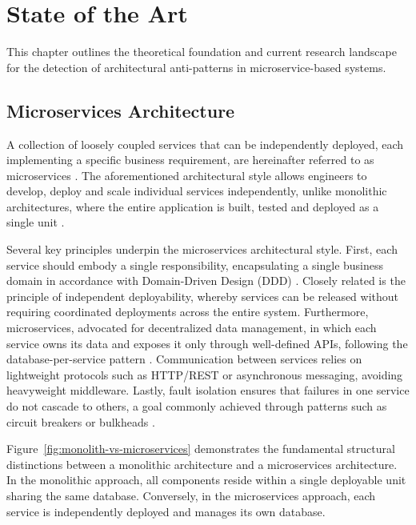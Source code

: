 \chapter{State of the Art}
\label{chap:ch2}

\par This chapter outlines the theoretical foundation and current research landscape for the detection of architectural anti-patterns in microservice-based systems.

\section {Microservices Architecture}
\label{section:microservices-background}

\par A collection of loosely coupled services that can be independently deployed, each implementing a specific business requirement, are hereinafter referred to as microservices \cite{Newman2015}. The aforementioned architectural style allows engineers to develop, deploy and scale individual services independently, unlike monolithic architectures, where the entire application is built, tested and deployed as a single unit \cite{Richardson2018}.

Several key principles underpin the microservices architectural style. First, each service should embody a single responsibility, encapsulating a single business domain in accordance with Domain-Driven Design (DDD) \cite{Evans2004}. Closely related is the principle of independent deployability, whereby services can be released without requiring coordinated deployments across the entire system. Furthermore, microservices, advocated for decentralized data management, in which each service owns its data and exposes it only through well-defined APIs, following the database-per-service pattern \cite{Richardson2018}. Communication between services relies on lightweight protocols such as HTTP/REST or asynchronous messaging, avoiding heavyweight middleware. Lastly, fault isolation ensures that failures in one service do not cascade to others, a goal commonly achieved through patterns such as circuit breakers or bulkheads \cite{Nygard2018}.

Figure~\ref{fig:monolith-vs-microservices} demonstrates the fundamental structural distinctions between a monolithic architecture and a microservices architecture. In the monolithic approach, all components reside within a single deployable unit sharing the same database. Conversely, in the microservices approach, each service is independently deployed and manages its own database.


